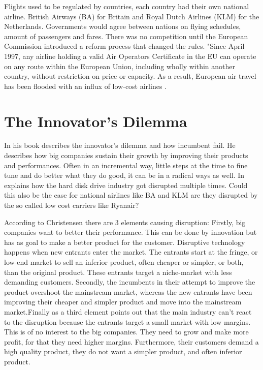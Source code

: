 \documentclass[a4paper, 11pt]{article}
\begin{document}
Flights used to be regulated by countries, each country had their own national airline. British Airways (BA) for Britain and
Royal Dutch Airlines (KLM) for the Netherlands. Governments would agree between nations on flying schedules, amount of
passengers and fares. There was no competition until the European Commission introduced a reform process that changed the
rules. "Since April 1997, any airline holding a valid Air Operators Certificate in the EU can operate on any route within the
European Union, including wholly within another country, without restriction on price or capacity. As a result, European air
travel has been flooded with an influx of low-cost airlines \citep{Eurocontrol2017}.


\label{sec:this-is-a-section}

\section{The Innovator's Dilemma}


In his book \cite{Christensen97} describes the innovator's dilemma and how incumbent fail. He describes how big companies sustain their growth by improving their products and performances. Often in an incremental way, little steps at the time to fine tune and do better what they do good, it can be in a radical ways as well. In \citep{Christensen97} explains how the hard disk drive industry got disrupted multiple times. Could this also be the case for national airlines like BA and KLM are they disrupted by the so called low cost carriers like Ryanair?

According to Christensen \cite{Christensen97} there are 3 elements causing disruption: Firstly, big companies want to better their performance. This can be done by innovation but has as goal to make a better product for the customer. Disruptive technology happens when new entrants enter the market. The entrants start at the fringe, or low-end market to sell an inferior product, often cheaper or simpler, or both, than the original product. These entrants target a niche-market with less demanding customers. Secondly, the incumbents in their attempt to improve the product overshoot the mainstream market, whereas the new entrants have been improving their cheaper and simpler product and move into the mainstream market.Finally as a third element \cite{Christensen97} points out that the main industry can't react to the disruption because the entrants target a small market with low margins. This is of no interest to the big companies. They need to grow and make more profit, for that they need higher margins. Furthermore, their customers demand a high quality product, they do not want a simpler product, and often inferior product.
\end{document}
